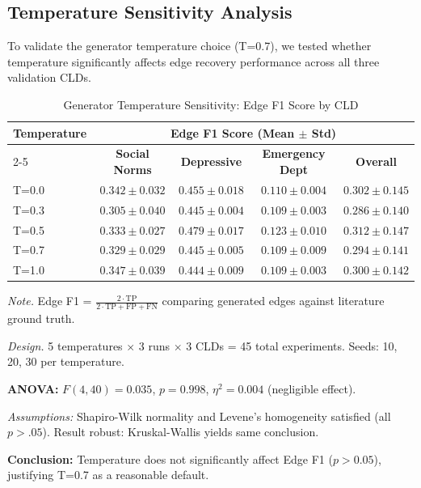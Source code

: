 \subsection{Temperature Sensitivity Analysis}

To validate the generator temperature choice (T=0.7), we tested whether temperature significantly affects edge recovery performance across all three validation CLDs.

\begin{table}[H]
\centering
\caption{Generator Temperature Sensitivity: Edge F1 Score by CLD}
\label{tab:temperature_sensitivity}
\begin{threeparttable}
\begin{tabular}{lcccc}
\toprule
\textbf{Temperature} & \multicolumn{4}{c}{\textbf{Edge F1 Score (Mean $\pm$ Std)}} \\
\cmidrule(lr){2-5}
 & \textbf{Social Norms} & \textbf{Depressive} & \textbf{Emergency Dept} & \textbf{Overall} \\
\midrule
T=0.0 & $0.342 \pm 0.032$ & $0.455 \pm 0.018$ & $0.110 \pm 0.004$ & $0.302 \pm 0.145$ \\
T=0.3 & $0.305 \pm 0.040$ & $0.445 \pm 0.004$ & $0.109 \pm 0.003$ & $0.286 \pm 0.140$ \\
T=0.5 & $0.333 \pm 0.027$ & $0.479 \pm 0.017$ & $0.123 \pm 0.010$ & $0.312 \pm 0.147$ \\
T=0.7 & $0.329 \pm 0.029$ & $0.445 \pm 0.005$ & $0.109 \pm 0.009$ & $0.294 \pm 0.141$ \\
T=1.0 & $0.347 \pm 0.039$ & $0.444 \pm 0.009$ & $0.109 \pm 0.003$ & $0.300 \pm 0.142$ \\
\bottomrule
\end{tabular}
\begin{tablenotes}
\small
\item \textit{Note.} Edge F1 = $\frac{2 \cdot \text{TP}}{2 \cdot \text{TP} + \text{FP} + \text{FN}}$ comparing generated edges against literature ground truth.
\item \textit{Design.} 5 temperatures $\times$ 3 runs $\times$ 3 CLDs = 45 total experiments. Seeds: 10, 20, 30 per temperature.
\item \textbf{ANOVA:} $F(4,40) = 0.035$, $p = 0.998$, $\eta^2 = 0.004$ (negligible effect).
\item \textit{Assumptions:} Shapiro-Wilk normality and Levene's homogeneity satisfied (all $p > .05$). Result robust: Kruskal-Wallis yields same conclusion.
\item \textbf{Conclusion:} Temperature does not significantly affect Edge F1 ($p > 0.05$), justifying T=0.7 as a reasonable default.
\end{tablenotes}
\end{threeparttable}
\end{table}

